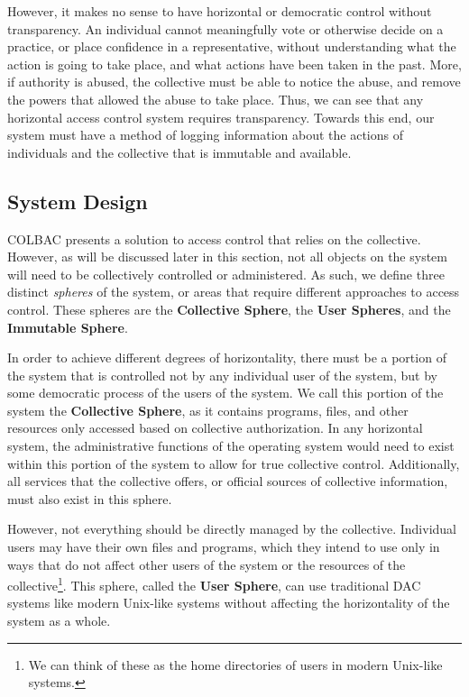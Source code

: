 However, it makes no sense to have horizontal or democratic control without
transparency. An individual cannot meaningfully vote or otherwise decide on a
practice, or place confidence in a representative, without understanding what
the action is going to take place, and what actions have been taken in the past.
More, if authority is abused, the collective must be able to notice the abuse,
and remove the powers that allowed the abuse to take place. Thus, we can see
that any horizontal access control system requires transparency. Towards this
end, our system must have a method of logging information about the actions of
individuals and the collective that is immutable and available.

\subsection{System Design}
\label{sec:colbacdesign}
COLBAC presents a solution to access control that relies on the collective.
However, as will be discussed later in this section, not all objects on the
system will need to be collectively controlled or administered. As such, we
define three distinct \textit{spheres} of the system, or areas that require
different approaches to access control. These spheres are the \textbf{Collective
Sphere}, the \textbf{User Spheres}, and the \textbf{Immutable Sphere}.

In order to achieve different degrees of horizontality, there must be a portion
of the system that is controlled not by any individual user of the system, but
by some democratic process of the users of the system. We call this portion of
the system the \textbf{Collective Sphere}, as it contains programs, files, and
other resources only accessed based on collective authorization. In any
horizontal system, the administrative functions of the operating system would
need to exist within this portion of the system to allow for true collective
control. Additionally, all services that the collective offers, or official
sources of collective information, must also exist in this sphere.

However, not everything should be directly managed by the collective. Individual
users may have their own files and programs, which they intend to use only in ways
that do not affect other users of the system or the resources of the
collective\footnote{We can think of these as the home directories of users in
modern Unix-like systems.}. This sphere, called the \textbf{User Sphere},
can use traditional DAC systems like modern Unix-like systems without affecting
the horizontality of the system as a whole.


